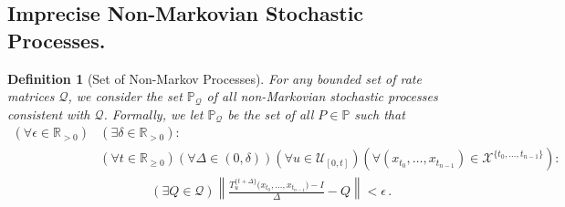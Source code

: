 \documentclass[10pt]{paper}
\newtheorem{definition}{Definition}
\newcommand{\reals}{\mathbb{R}}
\newcommand{\realspos}{\reals_{>0}}
\newcommand{\realsnonneg}{\reals_{\geq 0}}
\newcommand{\states}{\mathcal{X}}
\newcommand{\norm}[1]{\left\lVert #1 \right\rVert}
\begin{document}
\subsection{Imprecise Non-Markovian Stochastic Processes.} 


\begin{definition}[Set of Non-Markov Processes]\label{def:nonmarkov_set}
For any bounded set of rate matrices $\mathcal{Q}$, we consider the set $\mathbb{P}_\mathcal{Q}$ of all non-Markovian stochastic processes \emph{consistent} with $\mathcal{Q}$. Formally, we let $\mathbb{P}_{\mathcal{Q}}$ be the set of all $P\in\mathbb{P}$ such that
\newline
\begin{align*}
(\forall \epsilon\in\realspos)&(\exists \delta\in\realspos): \\
&(\forall t\in\realsnonneg)(\forall \Delta\in(0,\delta))(\forall u\in\mathcal{U}_{[0,t]})(\forall (x_{t_0},\ldots,x_{t_{n-1}})\in\states^{\{t_0,\ldots,t_{n-1}\}}): \\
&\quad\quad\quad\quad(\exists Q\in\mathcal{Q})\norm{\frac{T_u^{\{t+\Delta\}}\bigl(x_{t_0},\ldots,x_{t_{n-1}}\bigr) - I}{\Delta} - Q} < \epsilon\,.
\end{align*}
\end{definition}
\end{document}
